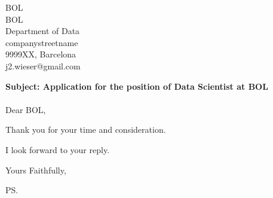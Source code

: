 \documentclass{letter}
\makeatletter
\newcommand{\letterdate}{1/1/2021}
\newcommand{\jobopening}{Data Scientist}
\newcommand{\companynameperson}{BOL}
\newcommand{\companyname}{BOL}
\newcommand{\companydepartment}{Department of Data}
\newcommand{\companystreet}{companystreetname}
\newcommand{\companypostal}{9999XX}
\newcommand{\companycity}{Barcelona}
\newcommand{\companyemail}{j2.wieser@gmail.com}
\makeatother
\begin{document}
\begin{letter}{\companynameperson \\ \companyname \\ \companydepartment \\ \companystreet \\ \companypostal, \companycity \\ \companyemail}


	\opening{
		{\bf Subject: Application for the position of {\jobopening} at \companyname} \\ ~ \\
	          Dear \companynameperson,
	}

%	

	Thank you for your time and consideration.

	I look forward to your reply.

	\closing{Yours Faithfully,}

	\ps


\end{letter}
\end{document}

